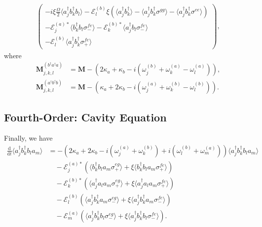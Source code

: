 \documentclass{article}
\newcommand{\ddt}[1][]{\frac{\mathrm{d} #1}{\mathrm{d}t}}
\begin{document}
\begin{subequations}
\begin{align}
\begin{pmatrix}
			-i \xi \frac{\Omega}{2} \langle a^{\dagger}_{j} b^{\dagger}_{k} b_{l} \rangle	- \mathcal{E}_{l}^{(b)} \xi \left( \langle a^{\dagger}_{j} b^{\dagger}_{k} \rangle - \langle a^{\dagger}_{j} b^{\dagger}_{k} \sigma^{gg} \rangle - \langle a^{\dagger}_{j} b^{\dagger}_{k} \sigma^{ee} \rangle \right) \\
			-\mathcal{E}_{j}^{(a) *} \langle b^{\dagger}_{k} b_{l} \sigma^{fe}_{-} \rangle - \mathcal{E}_{k}^{(b) *} \langle a^{\dagger}_{j} b_{l} \sigma^{fe}_{-} \rangle \\
			-\mathcal{E}_{l}^{(b)} \langle a^{\dagger}_{j} b^{\dagger}_{k} \sigma^{fe}_{+} \rangle
		\end{pmatrix},
	\end{align}
\end{subequations}
where
\begin{subequations}
	\begin{align}
		\bm{M}_{j, k, l}^{(b^{\dagger} a^{\dagger} a)} &= \bm{M} - \left( 2 \kappa_{a} + \kappa_{b} - i \left( \omega_{j}^{(b)} + \omega_{k}^{(a)} - \omega_{l}^{(a)} \right) \right), \\
		\bm{M}_{j, k, l}^{(a^{\dagger} b^{\dagger} b)} &= \bm{M} - \left( \kappa_{a} + 2 \kappa_{b} - i \left( \omega_{j}^{(a)} + \omega_{k}^{(b)} - \omega_{l}^{(b)} \right) \right).
	\end{align}
\end{subequations}

\subsection{Fourth-Order: Cavity Equation}

Finally, we have
\begin{align}
	\ddt \langle a^{\dagger}_{j} b^{\dagger}_{k} b_{l} a_{m} \rangle &= -\left( 2 \kappa_{a} + 2 \kappa_{b} - i \left( \omega_{j}^{(a)} + \omega_{k}^{(b)} \right) + i \left( \omega_{l}^{(b)} + \omega_{m}^{(a)} \right) \right) \langle a^{\dagger}_{j} b^{\dagger}_{k} b_{l} a_{m} \rangle \nonumber \\
	&\quad - \mathcal{E}_{j}^{(a) *} \left( \langle b^{\dagger}_{k} b_{l} a_{m} \sigma^{eg}_{+} \rangle + \xi \langle b^{\dagger}_{k} b_{l} a_{m} \sigma^{fe}_{+} \rangle \right) \nonumber \\
	&\quad - \mathcal{E}_{k}^{(b) *} \left( \langle a^{\dagger}_{j} a_{l} a_{m} \sigma^{eg}_{+} \rangle + \xi \langle a^{\dagger}_{j} a_{l} a_{m} \sigma^{fe}_{+} \rangle \right) \nonumber \\
	&\quad - \mathcal{E}_{l}^{(b)} \left( \langle a^{\dagger}_{j} b^{\dagger}_{k} a_{m} \sigma^{eg}_{-} \rangle + \xi \langle a^{\dagger}_{j} b^{\dagger}_{k} a_{m} \sigma^{fe}_{-} \rangle \right) \nonumber \\
	&\quad - \mathcal{E}_{m}^{(a)} \left( \langle a^{\dagger}_{j} b^{\dagger}_{k} b_{l} \sigma^{eg}_{-} \rangle + \xi \langle a^{\dagger}_{j} b^{\dagger}_{k} b_{l} \sigma^{fe}_{-} \rangle \right).
\end{align}
\end{document}
